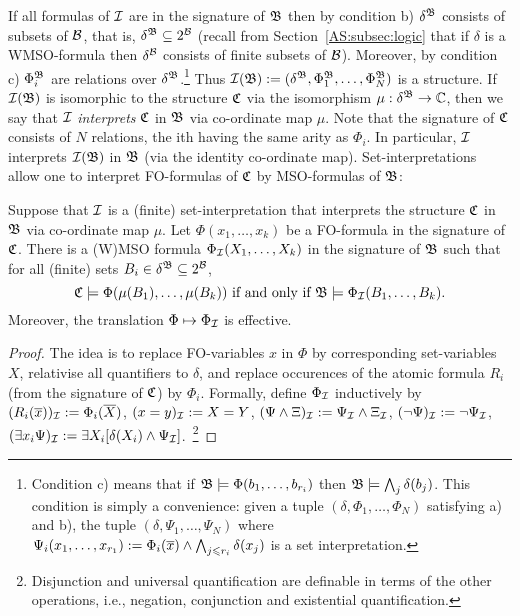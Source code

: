 If all formulas of ${\mathcal I}$ are in the signature of $\mathfrak{B}$ then by condition b) $\delta^{\mathfrak{B}}$ consists of subsets of ${\mathcal B}$, that is, $\delta^{\mathfrak{B}} \subseteq 2^{\mathcal B}$ 
(recall from Section~\ref{AS:subsec:logic} that if $\delta$ is a WMSO-formula then $\delta^{\mathcal B}$ consists of finite subsets of ${\mathcal B}$). Moreover, by condition c) $\Phi_i^{\mathfrak{B}}$ are relations over $\delta^{\mathfrak{B}}$.\footnote{Condition c) means that if $\mathfrak{B} \models \Phi(b_1, \dots, b_{r_i})$ then $\mathfrak{B} \models \bigwedge_j \delta(b_j)$. This condition is simply a convenience: given a tuple $(\delta, \Phi_1, \dots, \Phi_N)$ satisfying a) and b), the tuple $(\delta, \Psi_1, \dots, \Psi_N)$ where $\Psi_i(x_1, \dots, x_{r_1}) := \Phi_i(\mbox{$\overline {x}$}) \wedge \bigwedge_{j \leqslant r_i} \delta(x_j)$ is a set interpretation.}   Thus ${\mathcal I}(\mathfrak{B}) := (\delta^{\mathfrak{B}}, \Phi_1^{\mathfrak{B}}, \dots, \Phi_N^{\mathfrak{B}})$ is a structure. 
If ${\mathcal I}(\mathfrak{B})$ is isomorphic to the structure $\mathfrak{C}$ via the isomorphism $\mu:\delta^{\mathfrak{B}} \to \mathbb{C}$, then we say that ${\mathcal I}$ \emph{interprets} $\mathfrak{C}$ in $\mathfrak{B}$ via co-ordinate map $\mu$. Note that the signature of $\mathfrak{C}$ consists of $N$ relations, the ith having the same arity as $\Phi_i$. In particular, ${\mathcal I}$ interprets ${\mathcal I}(\mathfrak{B})$ in $\mathfrak{B}$ (via the identity co-ordinate map). Set-interpretations allow one to interpret FO-formulas of $\mathfrak{C}$ by MSO-formulas of $\mathfrak{B}$:

\begin{lemma} \label{AS:lem:translation:set-interpretation} 
Suppose that ${\mathcal I}$ is a (finite) set-interpretation that interprets the structure $\mathfrak{C}$ in $\mathfrak{B}$ via co-ordinate map $\mu$.
Let $\Phi(x_1,\dots,x_k)$ be a FO-formula in the signature of $\mathfrak{C}$. 
There is a (W)MSO formula $\Phi_{\mathcal I}(X_1,\dots,X_k)$ in the signature of $\mathfrak{B}$ such that for all (finite) sets $B_i \in \delta^{\mathfrak{B}} \subseteq 2^{\mathcal B}$,
\[
\mathfrak{C} \models \Phi(\mu(B_1),\dots,\mu(B_k)) \mbox{ if and only if } \mathfrak{B} \models \Phi_{\mathcal I}(B_1,\dots,B_k).
\]
Moreover, the translation $\Phi \mapsto \Phi_{\mathcal I}$ is effective.
\end{lemma}

\begin{proof}
The idea is to replace FO-variables $x$ in $\Phi$ by corresponding set-variables $X$, relativise all quantifiers to $\delta$, and replace 
occurences of the atomic formula $R_i$ (from the signature of $\mathfrak{C}$) by $\Phi_i$. Formally, define $\Phi_{\mathcal I}$ inductively by 
$(R_i(\mbox{$\overline {x}$}))_{\mathcal I}  := \Phi_i(\mbox{$\overline {X}$})$, $(x = y)_{\mathcal I} := X = Y$,
$(\Psi \wedge \Xi)_{\mathcal I}  := \Psi_{\mathcal I} \wedge \Xi_{\mathcal I}$,
$(\neg \Psi)_{\mathcal I}  := \neg \Psi_{\mathcal I}$,
$(\exists x_i \Psi)_{\mathcal I}  := \exists X_i [\delta(X_i) \wedge \Psi_{\mathcal I}]$.~\footnote{Disjunction and universal quantification are definable in terms of the other operations, i.e., negation, conjunction and existential quantification.}
\end{proof}



